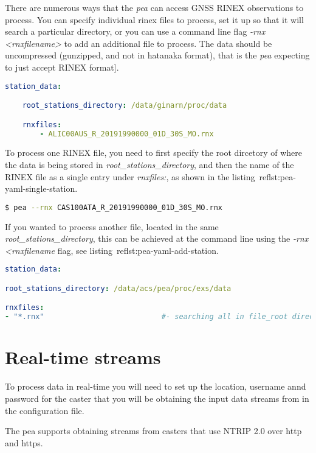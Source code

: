 There are numerous ways that the \emph{pea} can access GNSS RINEX observations to process. You can specify individual rinex files to process, set it up so that it will search a particular directory, or you can use a command line flag \emph{-rnx <rnxfilename>} to add an additional file to process. The data should be uncompressed (gunzipped, and not in hatanaka format), that is the \emph{pea} expecting to just accept RINEX format]. 
%
\begin{lstlisting}[language=yaml,caption=pea yaml processing one station example]
station_data:

	root_stations_directory: /data/ginarn/proc/data

	rnxfiles:
		- ALIC00AUS_R_20191990000_01D_30S_MO.rnx                          
\end{lstlisting}
%
To process one RINEX file, you need to first specify the root dircetory of where the data is being stored in \emph{root\_stations\_directory}, and then the name of the RINEX file as a single entry under \emph{rnxfiles:}, as shown in the listing~ref{lst:pea-yaml-single-station}. 
%
\begin{lstlisting}[language=bash,caption=Example showing how to add a RINEX file to the processing list form the command line]
$ pea --rnx CAS100ATA_R_20191990000_01D_30S_MO.rnx
\end{lstlisting}
%
If you wanted to process another file, located in the same \emph{root\_stations\_directory}, this can be achieved at the command line using the \emph{-rnx <rnxfilename} flag, see listing~ref{lst:pea-yaml-add-station}.
%
\begin{lstlisting}[language=yaml,caption=yaml input files configuration example]
station_data:

root_stations_directory: /data/acs/pea/proc/exs/data

rnxfiles:
- "*.rnx"                           #- searching all in file_root directory
\end{lstlisting}

\section{Real-time streams}
To process data in real-time you will need to set up the location, username annd password for the caster that you will be obtaining the input data streams from in the configuration file.

The pea supports obtaining streams from casters that use NTRIP 2.0 over http and https.

